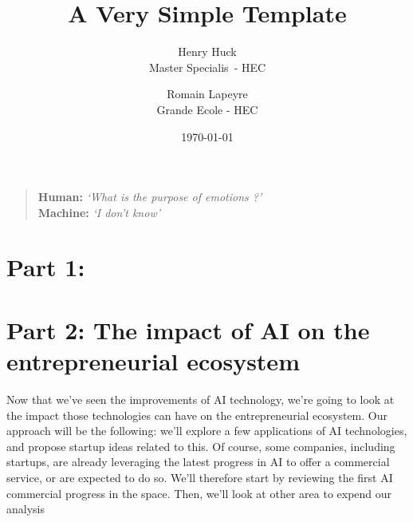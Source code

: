 \documentclass[11pt]{article}
\title{A Very Simple \LaTeXe{} Template}
\author{
        Henry Huck \\
        Master Specialis\ - HEC \\
        \and
        Romain Lapeyre\\
        Grande Ecole - HEC\\
}
\date{\today}
\begin{document}
\maketitle
\thispagestyle{empty}

\pagebreak


\phantom{TEXT}
\thispagestyle{empty}

\vspace{200pt}
\begin{quotation}
\noindent \textbf{Human:}  \textit{\lq What is the purpose of emotions ?\rq }\\
\textbf{Machine:} \textit{\lq I don't know\rq}
\end{quotation}

\pagebreak


\tableofcontents

\pagebreak

\chapter{Part 1:}


\chapter{Part 2: The impact of AI on the entrepreneurial ecosystem}

Now that we've seen the improvements of AI technology, we're going to look at the impact those technologies can have on the entrepreneurial ecosystem. Our approach will be the following: we'll explore a few applications of AI technologies, and propose startup ideas related to this. 
Of course, some companies, including startups, are already leveraging the latest progress in AI to offer a commercial service, or are expected to do so. We'll therefore start by reviewing the first AI commercial progress in the space. Then, we'll look at other area to expend our analysis
\end{document}
